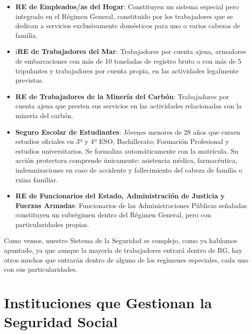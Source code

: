 \begin{enumerate}[label=(\alph*)]
\begin{itemize}
        \item \textbf{RE de Empleados/as del Hogar}: Constituyen un sistema especial pero integrado en el Régimen General, constituido por los trabajadores que se dedican a servicios exclusivamente domésticos para uno o varios cabezas de familia.

        \item i\textbf{RE de Trabajadores del Mar}: Trabajadores por cuenta ajena, armadores de embarcaciones con más de 10 toneladas de registro bruto o con más de 5 tripulantes y trabajadores por cuenta propia, en las actividades legalmente previstas.

        \item \textbf{RE de Trabajadores de la Minería del Carbón}: Trabajadores por cuenta ajena que presten sus servicios en las actividades relacionadas con la minería del carbón.

        \item \textbf{Seguro Escolar de Estudiantes}: Jóvenes menores de 28 años que cursen estudios oficiales en 3º y 4º ESO, Bachillerato; Formación Profesional y estudios universitarios. Se formaliza automáticamente con la matrícula. Su acción protectora comprende únicamente: asistencia médica, farmacéutica, indemnizaciones en caso de accidente y fallecimiento del cabeza de familia o ruina familiar.

        \item \textbf{RE de Funcionarios del Estado, Administración de Justicia y Fuerzas Armadas}: Funcionarios de las Administraciones Públicas señaladas constituyen un subrégimen dentro del Régimen General, pero con particularidades propias.
    \end{itemize}
\end{enumerate}

Como vemos, nuestro Sistema de la Seguridad es complejo, como ya habíamos apuntado, ya que aunque la mayoría de trabajadores entrará dentro de RG, hay otros muchos que entrarán dentro de alguno de los regímenes especiales, cada uno con sus particularidades.

\section{Instituciones que Gestionan la Seguridad Social}

\appendix


